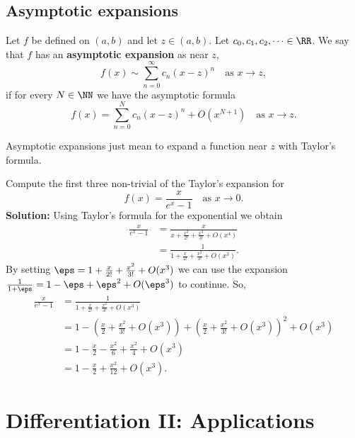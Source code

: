 \documentclass[12pt, a4paper]{article}
\begin{document}
\subsection{Asymptotic expansions}

\begin{definition}
    Let \(f\) be defined on \((a,b)\) and let \(z\in (a,b)\). Let \(c_0,c_1,c_2, \cdots \in \RR\). We say that \(f\) has an \textbf{asymptotic expansion} as near \(z\),
    \[
        f(x) \sim \sum_{n=0}^{\infty} c_n (x-z)^n \quad \text{as } x\to z,
    \]
    if for every \(N\in \NN\) we have the asymptotic formula
    \[
        f(x) = \sum_{n=0}^{N} c_n (x-z)^n +O(x^{N+1}) \quad \text{as } x\to z.
    \]
\end{definition}

\begin{mdnote}
    Asymptotic expansions just mean to expand a function near \(z\) with Taylor's formula.
\end{mdnote}

\begin{mdexample}
    Compute the first three non-trivial of the Taylor's expansion for
    \[f(x)=\frac{x}{e^x-1} \quad \text{as } x\to 0.\] 
    \textbf{Solution:} Using Taylor's formula for the exponential we obtain
    \[\begin{aligned}
        \frac{x}{e^x-1} &= \frac{x}{x+\frac{x^2}{2!}+\frac{x^3}{3!}+O(x^4)} \\
        &= \frac{1}{1+\frac{x}{2!}+\frac{x^2}{3!}+O(x^3)}.
    \end{aligned}\]
    By setting \(\eps =1+\frac{x}{2!}+\frac{x^2}{3!}+O(x^3)\) we can use the expansion \(\frac{1}{1+\eps} =1 -\eps+\eps^2 + O(\eps^3)\) to continue. So,
    \[\begin{aligned}
        \frac{x}{e^x-1} &= \frac{1}{1+\frac{x}{2!}+\frac{x^2}{3!}+O(x^3)} \\
        &= 1- \left( \frac{x}{2}+\frac{x^2}{3!} +O(x^3) \right) +\left( \frac{x}{2}+\frac{x^2}{3!} +O(x^3) \right)^2 +O(x^3) \\
        &= 1- \frac{x}{2} -\frac{x^2}{6} +\frac{x^2}{4} +O(x^3) \\
        &= 1- \frac{x}{2} +\frac{x^2}{12} +O(x^3).
    \end{aligned}\]
\end{mdexample}

\section{Differentiation II: Applications}
\end{document}
